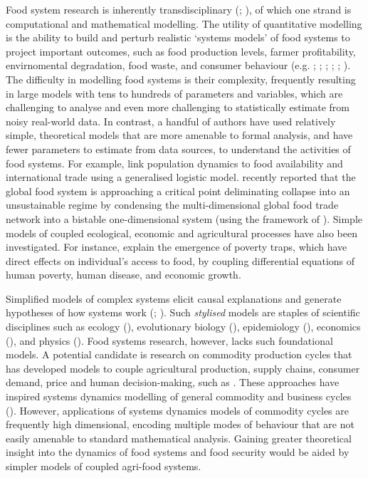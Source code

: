 \documentclass[12pt]{article}
\begin{document}
Food system research is inherently transdisciplinary (\cite{drimie2013}; \cite{hammond2012}), of which one strand is computational and mathematical modelling. The utility of quantitative modelling is the ability to build and perturb realistic `systems models' of food systems to project important outcomes, such as food production levels, farmer profitability, envirnomental degradation, food waste, and consumer behaviour (e.g. \cite{springmann2018}; \cite{marchand2016}; \cite{sampedro2020}; \cite{suweis2015}; \cite{scalco2019}; \cite{allen2016}). The difficulty in modelling food systems is their complexity, frequently resulting in large models with tens to hundreds of parameters and variables, which are challenging to analyse and even more challenging to statistically estimate from noisy real-world data. In contrast, a handful of authors have used relatively simple, theoretical models that are more amenable to formal analysis, and have fewer parameters to estimate from data sources, to understand the activities of food systems. For example, \textcite{suweis2015} link population dynamics to food availability and international trade using a generalised logistic model. \textcite{tu2019} recently reported that the global food system is approaching a critical point deliminating collapse into an unsustainable regime by condensing the multi-dimensional global food trade network into a bistable one-dimensional system (using the framework of \cite{gao2016}). Simple models of coupled ecological, economic and agricultural processes have also been investigated. For instance, \textcite{ngonghala2017} explain the emergence of poverty traps, which have direct effects on individual's access to food, by coupling differential equations of human poverty, human disease, and economic growth.

Simplified models of complex systems elicit causal explanations and generate hypotheses of how systems work (\cite{smaldino2017}; \cite{smaldino2019}). Such \textit{stylised} models are staples of scientific disciplines such as ecology (\cite{may1973}), evolutionary biology (\cite{boyd2003}), epidemiology (\cite{kermack1927}), economics (\cite{nerlove1958}), and physics (\cite{strogatz1994}). Food systems research, however, lacks such foundational models. A potential candidate is research on commodity production cycles that has developed models to couple agricultural production, supply chains, consumer demand, price and human decision-making, such as \textcite{meadows1971}. These approaches have inspired systems dynamics modelling of general commodity and business cycles (\cite{sterman2000}). However, applications of systems dynamics models of commodity cycles are frequently high dimensional, encoding multiple modes of behaviour that are not easily amenable to standard mathematical analysis. Gaining greater theoretical insight into the dynamics of food systems and food security would be aided by simpler models of coupled agri-food systems.
\end{document}
